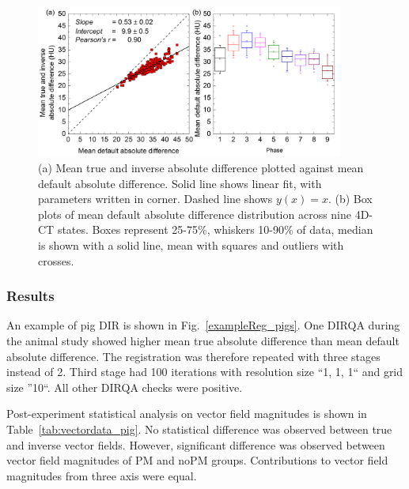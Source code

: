 \documentclass[type=dr, dr=rernat, accentcolor=tud7b,colorbacktitle, bigchapter, openright, twoside, 12pt ]{tudthesis}
\begin{document}
\begin{figure}[H]
	\begin{center}		
		\includegraphics[width=0.9\textwidth]{./Images/AbsDiff_pigs.png}
		\caption{(a) Mean true and inverse absolute difference plotted against mean default absolute difference. Solid line shows linear fit, with parameters
		written in corner. Dashed line shows $y(x)=x$. (b) Box plots of mean default absolute difference distribution across nine 4D-CT states. Boxes represent 25-75\%, whiskers 10-90\%
		of data, median is shown with a solid line, mean with squares and outliers with crosses.}
		\label{absDiff_pigs}
	\end{center}
\end{figure}

\subsubsection{Results}

An example of pig DIR is shown in Fig.~\ref{exampleReg_pigs}. One DIRQA during the animal study showed higher mean true absolute difference than mean default absolute difference. The registration
was therefore repeated with three stages instead of 2. Third stage had 100 iterations with resolution size ``1, 1, 1`` and grid size ''10``. All other DIRQA checks were positive.

Post-experiment statistical analysis on vector field magnitudes is shown in Table~\ref{tab:vectordata_pig}. No statistical difference was
observed between true and inverse vector fields. However, significant difference was observed between vector field magnitudes of PM and noPM groups. Contributions to vector field magnitudes from three axis were equal. 
\end{document}
